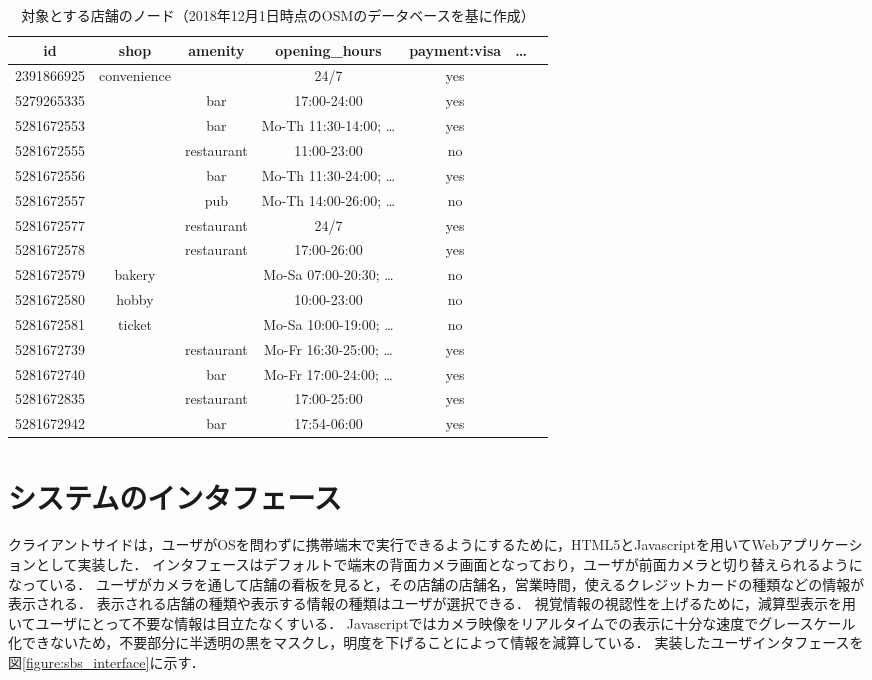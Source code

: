 \begin{table}[tb]
    \caption{対象とする店舗のノード（2018年12月1日時点のOSMのデータベースを基に作成）}
    \label{table:storelist}
    \begin{center}
      \begin{tabular}{c|cccccc}
        \hline\hline
        \textbf{id} & \textbf{shop} & \textbf{amenity} & \textbf{opening\_hours} & \textbf{payment:visa} & \textbf{\ldots} \\ 
        \hline
        2391866925 & convenience & & 24/7 & yes & \\
        5279265335 & & bar & 17:00-24:00 & yes & \\
        5281672553 & & bar & Mo-Th 11:30-14:00; \ldots & yes & \\
        5281672555 & & restaurant & 11:00-23:00 & no & \\
        5281672556 & & bar & Mo-Th 11:30-24:00; \ldots & yes & \\
        5281672557 & & pub & Mo-Th 14:00-26:00; \ldots & no & \\
        5281672577 & & restaurant & 24/7 & yes & \\
        5281672578 & & restaurant & 17:00-26:00 & yes & \\
        5281672579 & bakery & & Mo-Sa 07:00-20:30; \ldots & no & \\
        5281672580 & hobby & & 10:00-23:00 & no & \\
        5281672581 & ticket & & Mo-Sa 10:00-19:00; \ldots & no & \\
        5281672739 & & restaurant & Mo-Fr 16:30-25:00; \ldots & yes & \\
        5281672740 & & bar & Mo-Fr 17:00-24:00; \ldots & yes & \\
        5281672835 & & restaurant & 17:00-25:00 & yes & \\
        5281672942 & & bar & 17:54-06:00 & yes & \\
        \hline
      \end{tabular}
    \end{center}


  \end{table}


\section{システムのインタフェース}
  クライアントサイドは，ユーザがOSを問わずに携帯端末で実行できるようにするために，HTML5とJavascriptを用いてWebアプリケーションとして実装した．
  インタフェースはデフォルトで端末の背面カメラ画面となっており，ユーザが前面カメラと切り替えられるようになっている．
  ユーザがカメラを通して店舗の看板を見ると，その店舗の店舗名，営業時間，使えるクレジットカードの種類などの情報が表示される．
  表示される店舗の種類や表示する情報の種類はユーザが選択できる．
  視覚情報の視認性を上げるために，減算型表示を用いてユーザにとって不要な情報は目立たなくすいる．
  Javascriptではカメラ映像をリアルタイムでの表示に十分な速度でグレースケール化できないため，不要部分に半透明の黒をマスクし，明度を下げることによって情報を減算している．
  実装したユーザインタフェースを図\ref{figure:sbs_interface}に示す．

